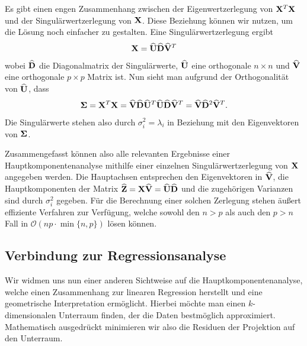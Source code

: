 Es gibt einen engen Zusammenhang zwischen der Eigenwertzerlegung von $\mathbf{X}^T \mathbf{X}$ und der Singulärwertzerlegung von $\mathbf{X}$. Diese Beziehung können wir nutzen, um die Lösung noch einfacher zu gestalten. Eine Singulärwertzerlegung ergibt
$$\mathbf{X} = \widehat{\mathbf{U}}\widehat{\mathbf{D}}\widehat{\mathbf{V}}^T$$
wobei $\widehat{\mathbf{D}}$ die Diagonalmatrix der Singulärwerte, $\widehat{\mathbf{U}}$ eine orthogonale $n \times n$ und $\widehat{\mathbf{V}}$ eine orthogonale $p \times p$ Matrix ist. Nun sieht man aufgrund der Orthogonalität von $\widehat{\mathbf{U}}$, dass
$$\mathbf{\Sigma} = \mathbf{X}^T \mathbf{X} = \widehat{\mathbf{V}}\widehat{\mathbf{D}}\widehat{\mathbf{U}}^T \widehat{\mathbf{U}}\widehat{\mathbf{D}}\widehat{\mathbf{V}}^T = \widehat{\mathbf{V}} \widehat{\mathbf{D}}^2 \widehat{\mathbf{V}}^T.$$
Die Singulärwerte stehen also durch $\sigma_i^2 = \lambda_i$ in Beziehung mit den Eigenvektoren von $\mathbf{\Sigma}$. 

Zusammengefasst können also alle relevanten Ergebnisse einer Hauptkomponentenanalyse mithilfe einer einzelnen Singulärwertzerlegung von $\mathbf{X}$ angegeben werden. Die Hauptachsen entsprechen den Eigenvektoren in $\widehat{\mathbf{V}}$, die Hauptkomponenten der Matrix $\widehat{\mathbf{Z}} = \mathbf{X} \widehat{\mathbf{V}} = \widehat{\mathbf{U}} \widehat{\mathbf{D}}$ und die zugehörigen Varianzen sind durch $\sigma_i^2$ gegeben. Für die Berechnung einer solchen Zerlegung stehen äußert effiziente Verfahren zur Verfügung, welche sowohl den $n>p$ als auch den $p>n$ Fall in $\mathcal{O}(np \cdot \min\{n,p\})$ lösen können. 

\subsection{Verbindung zur Regressionsanalyse}

Wir widmen uns nun einer anderen Sichtweise auf die Hauptkomponentenanalyse, welche einen Zusammenhang zur linearen Regression herstellt und eine geometrische Interpretation ermöglicht. Hierbei möchte man einen $k$-dimensionalen Unterraum finden, der die Daten bestmöglich approximiert. Mathematisch ausgedrückt minimieren wir also die Residuen der Projektion auf den Unterraum.

